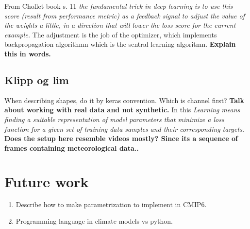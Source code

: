 From Chollet book s. 11 \textit{the fundamental trick in deep learning is to use this score (result from performance metric) as a feedback signal to adjust the value of the weights a little, in a direction that will lower the loss score for the current example. } The adjustment is the job of the optimizer, which implements backpropagation algorithmn which is the sentral learning algoritmn.
\textbf{Explain this in words.}



\subsection{Klipp og lim}


When describing shapes, do it by keras convention. Which is channel first? \textbf{Talk about working with real data and not synthetic.} In this 
\textit{Learning means finding a suitable representation of model parameters that minimize a loss function for a given set of training data samples and their corresponding targets.}
\textbf{Does the setup here resemble videos mostly? Since its a sequence of frames containing meteorological data..}

\section{Future work}
\begin{enumerate}
    \item Describe how to make parametrization to implement in CMIP6.
    \item Programming language in climate models vs python.
\end{enumerate}



